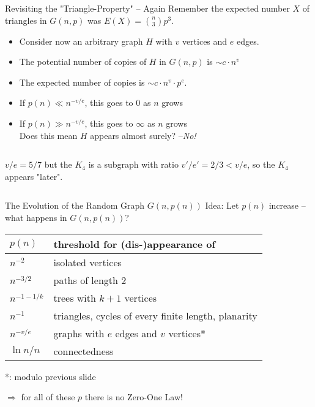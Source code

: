 \documentclass[draft]{beamer}
\begin{document}
\begin{frame}{Revisiting the "Triangle-Property" -- Again}
Remember the expected number $X$ of triangles in $G(n,p)$ was $E(X)={n\choose 3}p^3$.

\pause
\bigskip
\begin{itemize}
  \item Consider now an arbitrary graph $H$ with $v$ vertices and $e$ edges. 
  \item The potential number of copies of $H$ in $G(n,p)$ is $\sim c\cdot n^v$
  \item The expected number of copies is $\sim c\cdot n^v\cdot p^e$.
  \item If $p(n)\ll n^{-v/e}$, this goes to $0$ as $n$ grows
  \item If $p(n)\gg n^{-v/e}$, this goes to $\infty$ as $n$ grows\\
Does this mean $H$ appears almost surely? --\pause \emph{No!}
\end{itemize}
\begin{columns}
\column{3cm}

\column{6cm}
$v/e=5/7$ but the $K_4$ is a subgraph with ratio $v'/e'=2/3<v/e$, so the $K_4$ appears "later".
\end{columns}
\end{frame}


\begin{frame}{The Evolution of the Random Graph $G(n,p(n))$}
	Idea: Let $p(n)$ increase -- what happens in $G(n,p(n))$?

	\begin{table}
		\centering
		\begin{tabular}{ll}
			$p(n)$ & threshold for (dis-)appearance of \\
			\hline
			$n^{-2}$ & isolated vertices \\
			$n^{-3/2}$ & paths of length $2$ \\
			$n^{-1-1/k}$ & trees with $k+1$ vertices \\
			$n^{-1}$ & triangles, cycles of every finite length, planarity \\
			$n^{-v/e}$ & graphs with $e$ edges and $v$ vertices* \\
			$\ln{n}/n$ & connectedness
		\end{tabular}
	\end{table}

	*: modulo previous slide

	$\Rightarrow$ for all of these $p$ there is no Zero-One Law!
\end{frame}



\begin{frame}{}
\end{frame}
\begin{frame}{}
\end{frame}
\begin{frame}{}
\end{frame}
\end{document}

